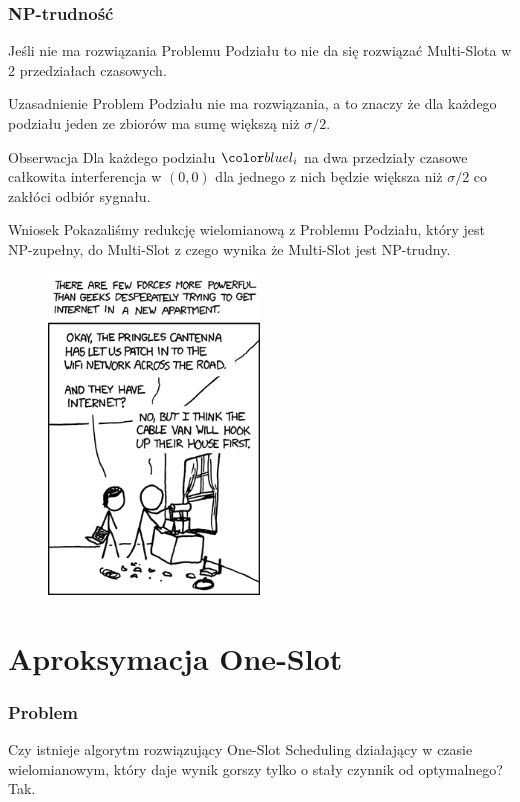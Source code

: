 \documentclass[polish, t,10pt]{beamer}
\begin{document}
\begin{frame}
    \frametitle{NP-trudność}
    Jeśli nie ma rozwiązania Problemu Podziału to nie da się rozwiązać Multi-Slota w 2 przedziałach czasowych.
    \begin{block}{Uzasadnienie}
        Problem Podziału nie ma rozwiązania, a to znaczy że dla każdego podziału jeden ze zbiorów ma sumę większą niż $\sigma/2$.
    \end{block}
    \begin{block}{Obserwacja}
        Dla każdego podziału $\li$ na dwa przedziały czasowe całkowita interferencja w $(0, 0)$ dla jednego z nich będzie większa niż $\sigma/2$ co zakłóci odbiór sygnału.
    \end{block}
    \pause
    \begin{block}{Wniosek}
        Pokazaliśmy redukcję wielomianową z Problemu Podziału, który jest NP-zupełny, do Multi-Slot z czego wynika że Multi-Slot jest NP-trudny.
    \end{block}
\end{frame}

\begin{frame}[c]
    \begin{figure}
        \includegraphics[width=0.5\textwidth]{pictures/obligatory-xkcd.png}
    \end{figure}
\end{frame}

\section{Aproksymacja One-Slot}
\begin{frame}
    \frametitle{Problem}
        Czy istnieje algorytm rozwiązujący One-Slot Scheduling działający w czasie wielomianowym,
        który daje wynik gorszy tylko o stały czynnik od optymalnego?
        \pause
        \vfill
        Tak.
\end{frame}
\end{document}
